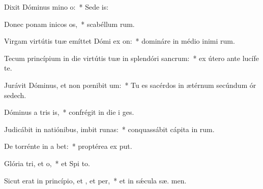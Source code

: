 \item Dixit Dóminus mino o:~* Sede   is:
\item Donec ponam inicos os,~* scabéllum  rum.
\item Virgam virtútis tuæ emíttet Dómi ex on:~* domináre in médio inimi rum.
\item Tecum princípium in die virtútis tuæ in splendóri sancrum:~* ex útero ante lucífe  te.
\item Jurávit Dóminus, et non pœnibit um:~* Tu es sacérdos in ætérnum secúndum ór sedech.
\item Dóminus a tris is,~* confrégit in die i  ges.
\item Judicábit in natiónibus, imbit runas:~* conquassábit cápita in  rum.
\item De torrénte in a bet:~* proptérea ex put.
\item Glória tri, et o,~* et Spi to.
\item Sicut erat in princípio, et , et per,~* et in sǽcula sæ. men.
